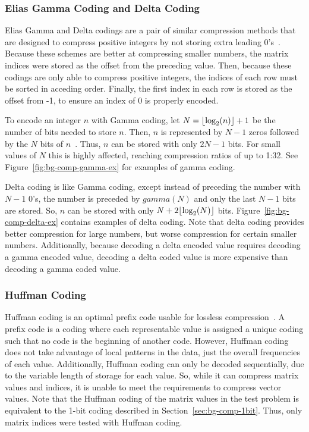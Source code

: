 \subsubsection{Elias Gamma Coding and Delta Coding}
Elias Gamma and Delta codings are a pair of similar compression methods that are designed to compress positive integers by not storing extra leading 0's~\cite{Elias:1975:codeword}.
Because these schemes are better at compressing smaller numbers, the matrix indices were stored as the offset from the preceding value.
Then, because these codings are only able to compress positive integers, the indices of each row must be sorted in acceding order.
Finally, the first index in each row is stored as the offset from -1, to ensure an index of 0 is properly encoded.

To encode an integer \(n\) with Gamma coding, let \(N = \lfloor\log_2(n)\rfloor+1\) be the number of bits needed to store \(n\).
Then, \(n\) is represented by \(N-1\) zeros followed by the \(N\) bits of \(n\)~\cite{Elias:1975:codeword}.
Thus, \(n\) can be stored with only \(2N-1\) bits.
For small values of \(N\) this is highly affected, reaching compression ratios of up to 1:32.
See Figure~\ref{fig:bg-comp-gamma-ex} for examples of gamma coding.



Delta coding is like Gamma coding, except instead of preceding the number with \(N-1\) 0's, the number is preceded by \(gamma(N)\) and only the last \(N-1\) bits are stored.
So, \(n\) can be stored with only \(N + 2\lfloor\log_2(N)\rfloor\) bits.
Figure~\ref{fig:bg-comp-delta-ex} contains examples of delta coding.
Note that delta coding provides better compression for large numbers, but worse compression for certain smaller numbers.
Additionally, because decoding a delta encoded value requires decoding a gamma encoded value, decoding a delta coded value is more expensive than decoding a gamma coded value.



\subsubsection{Huffman Coding}
\label{sec:bg-comp-huffman}
Huffman coding is an optimal prefix code usable for lossless compression~\cite{Huffman:1952:coding}.
A prefix code is a coding where each representable value is assigned a unique coding such that no code is the beginning of another code.
However, Huffman coding does not take advantage of local patterns in the data, just the overall frequencies of each value.
Additionally, Huffman coding can only be decoded sequentially, due to the variable length of storage for each value.
So, while it can compress matrix values and indices, it is unable to meet the requirements to compress vector values.
Note that the Huffman coding of the matrix values in the test problem is equivalent to the 1-bit coding described in Section~\ref{sec:bg-comp-1bit}.
Thus, only matrix indices were tested with Huffman coding.

